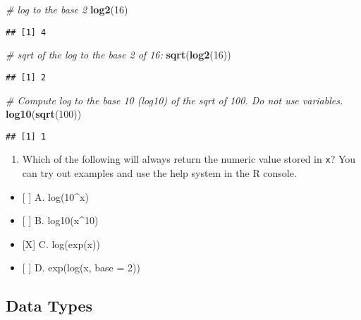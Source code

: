 \documentclass[]{article}
\newenvironment{Shaded}{\begin{snugshade}}{\end{snugshade}}
\newcommand{\CommentTok}[1]{\textcolor[rgb]{0.56,0.35,0.01}{\textit{#1}}}
\newcommand{\DecValTok}[1]{\textcolor[rgb]{0.00,0.00,0.81}{#1}}
\newcommand{\KeywordTok}[1]{\textcolor[rgb]{0.13,0.29,0.53}{\textbf{#1}}}
\newcommand{\NormalTok}[1]{#1}
\providecommand{\tightlist}{%
  \setlength{\itemsep}{0pt}\setlength{\parskip}{0pt}}
\begin{document}
\begin{Shaded}
\begin{Highlighting}[]
\CommentTok{# log to the base 2 }
\KeywordTok{log2}\NormalTok{(}\DecValTok{16}\NormalTok{)}
\end{Highlighting}
\end{Shaded}

\begin{verbatim}
## [1] 4
\end{verbatim}

\begin{Shaded}
\begin{Highlighting}[]
\CommentTok{# sqrt of the log to the base 2 of 16:}
\KeywordTok{sqrt}\NormalTok{(}\KeywordTok{log2}\NormalTok{(}\DecValTok{16}\NormalTok{))}
\end{Highlighting}
\end{Shaded}

\begin{verbatim}
## [1] 2
\end{verbatim}

\begin{Shaded}
\begin{Highlighting}[]
\CommentTok{# Compute log to the base 10 (log10) of the sqrt of 100. Do not use variables.}
\KeywordTok{log10}\NormalTok{(}\KeywordTok{sqrt}\NormalTok{(}\DecValTok{100}\NormalTok{))}
\end{Highlighting}
\end{Shaded}

\begin{verbatim}
## [1] 1
\end{verbatim}

\begin{enumerate}
\def\labelenumi{\arabic{enumi}.}
\setcounter{enumi}{4}
\tightlist
\item
  Which of the following will always return the numeric value stored in
  \texttt{x}? You can try out examples and use the help system in the R
  console.
\end{enumerate}

\begin{itemize}
\tightlist
\item
  {[} {]} A. log(10\^{}x)
\item
  {[} {]} B. log10(x\^{}10)
\item
  {[}X{]} C. log(exp(x))
\item
  {[} {]} D. exp(log(x, base = 2))
\end{itemize}

\hypertarget{data-types}{%
\subsection{Data Types}\label{data-types}}
\end{document}
